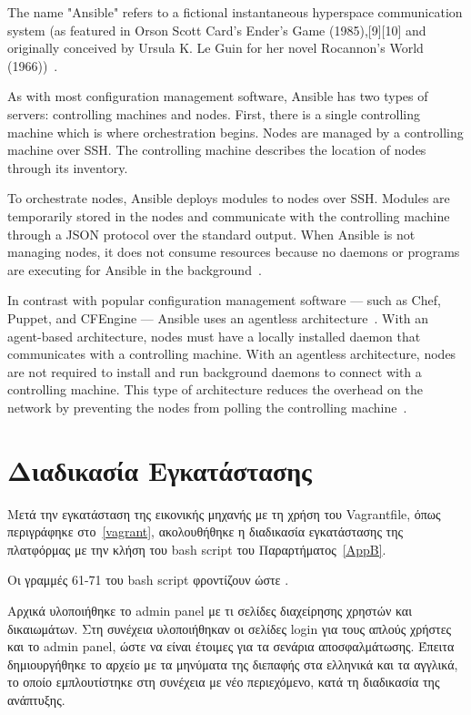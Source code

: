 \documentclass[12pt]{report}
\begin{document}
The name "Ansible" refers to a fictional instantaneous hyperspace communication system (as featured in Orson Scott Card's Ender's Game (1985),[9][10] and originally conceived by Ursula K. Le Guin for her novel Rocannon's World (1966))~\cite{worldcat}.

As with most configuration management software, Ansible has two types of servers: controlling machines and nodes. First, there is a single controlling machine which is where orchestration begins. Nodes are managed by a controlling machine over SSH. The controlling machine describes the location of nodes through its inventory.

To orchestrate nodes, Ansible deploys modules to nodes over SSH. Modules are temporarily stored in the nodes and communicate with the controlling machine through a JSON protocol over the standard output. When Ansible is not managing nodes, it does not consume resources because no daemons or programs are executing for Ansible in the background~\cite{wikipedia_2019}.

In contrast with popular configuration management software — such as Chef, Puppet, and CFEngine — Ansible uses an agentless architecture~\cite{wikipedia_2019}. With an agent-based architecture, nodes must have a locally installed daemon that communicates with a controlling machine. With an agentless architecture, nodes are not required to install and run background daemons to connect with a controlling machine. This type of architecture reduces the overhead on the network by preventing the nodes from polling the controlling machine~\cite{wikipedia_2019}.

\section{Διαδικασία Εγκατάστασης}
Μετά την εγκατάσταση της εικονικής μηχανής με τη χρήση του \textlatin{Vagrantfile}, όπως περιγράφηκε στο~\ref{vagrant}, ακολουθήθηκε η διαδικασία εγκατάστασης της πλατφόρμας με την κλήση του \textlatin{bash script} του Παραρτήματος~\ref{AppB}.

Οι γραμμές 61-71 του \textlatin{bash script} φροντίζουν ώστε .

Αρχικά υλοποιήθηκε το \textlatin{admin panel} με τι σελίδες διαχείρησης χρηστών και δικαιωμάτων. Στη συνέχεια υλοποιήθηκαν οι σελίδες \textlatin{login} για τους απλούς χρήστες και το \textlatin{admin panel}, ώστε να είναι έτοιμες για τα σενάρια αποσφαλμάτωσης. Έπειτα δημιουργήθηκε το αρχείο με τα μηνύματα της διεπαφής στα ελληνικά και τα αγγλικά, το οποίο εμπλουτίστηκε στη συνέχεια με νέο περιεχόμενο, κατά τη διαδικασία της ανάπτυξης.
\end{document}
